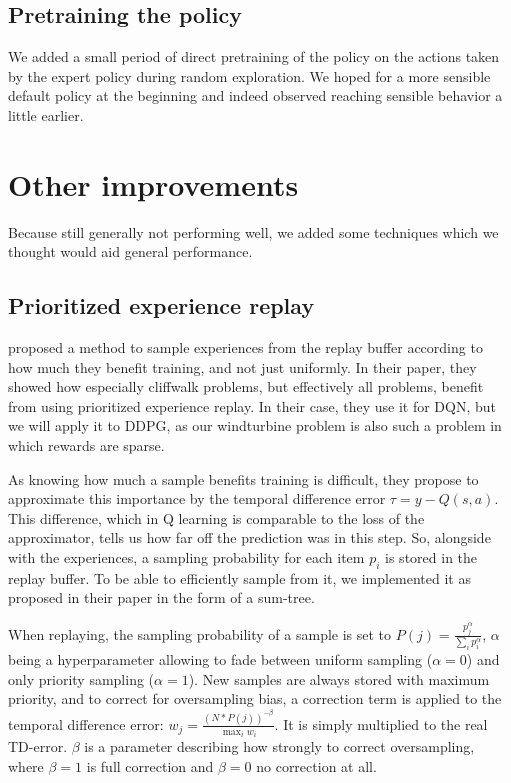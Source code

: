 \documentclass[hyperref,german,beleg]{cgvpub}
\begin{document}
\subsection{Pretraining the policy}

We added a small period of direct pretraining of the policy on the actions taken by the expert policy during random exploration. We hoped for a more sensible default policy at the beginning and indeed observed reaching sensible behavior a little earlier.

\section{Other improvements}

Because still generally not performing well, we added some techniques which we thought would aid general performance.

\subsection{Prioritized experience replay}

\cite{schaulPrioritizedExperienceReplay2016} proposed a method to sample experiences from the replay buffer according to how much they benefit training, and not just uniformly. In their paper, they showed how especially cliffwalk problems, but effectively all problems, benefit from using prioritized experience replay. In their case, they use it for \ac{DQN}, but we will apply it to \ac{DDPG}, as our windturbine problem is also such a problem in which rewards are sparse.

As knowing how much a sample benefits training is difficult, they propose to approximate this importance by the temporal difference error $\tau = y - Q(s, a)$. This difference, which in Q learning is comparable to the loss of the approximator, tells us how far off the prediction was in this step. So, alongside with the experiences, a sampling probability for each item $p_i$ is stored in the replay buffer. To be able to efficiently sample from it, we implemented it as proposed in their paper in the form of a sum-tree.

When replaying, the sampling probability of a sample is set to $P(j) = \frac{p_j^{\alpha}}{\sum_i{p_i^{\alpha}}}$, $\alpha$ being a hyperparameter allowing to fade between uniform sampling ($\alpha=0$) and only priority sampling ($\alpha=1$). New samples are always stored with maximum priority, and to correct for oversampling bias, a correction term is applied to the temporal difference error: $w_j = \frac{(N*P(j))^{-\beta}}{\max_i{w_i}}$. It is simply multiplied to the real TD-error. $\beta$ is a parameter describing how strongly to correct oversampling, where $\beta=1$ is full correction and $\beta=0$ no correction at all.
\end{document}
